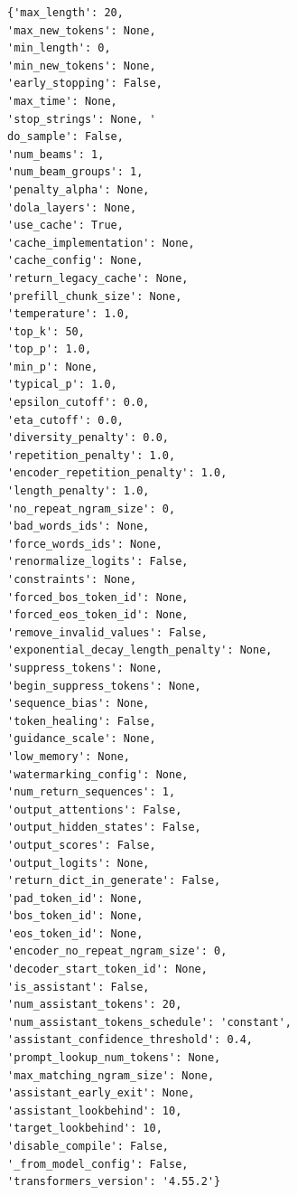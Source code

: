 \begin{verbatim}
{'max_length': 20, 
'max_new_tokens': None, 
'min_length': 0, 
'min_new_tokens': None, 
'early_stopping': False, 
'max_time': None, 
'stop_strings': None, '
do_sample': False, 
'num_beams': 1, 
'num_beam_groups': 1, 
'penalty_alpha': None, 
'dola_layers': None, 
'use_cache': True, 
'cache_implementation': None, 
'cache_config': None, 
'return_legacy_cache': None, 
'prefill_chunk_size': None, 
'temperature': 1.0, 
'top_k': 50, 
'top_p': 1.0, 
'min_p': None, 
'typical_p': 1.0, 
'epsilon_cutoff': 0.0, 
'eta_cutoff': 0.0, 
'diversity_penalty': 0.0, 
'repetition_penalty': 1.0, 
'encoder_repetition_penalty': 1.0, 
'length_penalty': 1.0, 
'no_repeat_ngram_size': 0, 
'bad_words_ids': None, 
'force_words_ids': None, 
'renormalize_logits': False, 
'constraints': None, 
'forced_bos_token_id': None, 
'forced_eos_token_id': None, 
'remove_invalid_values': False, 
'exponential_decay_length_penalty': None, 
'suppress_tokens': None, 
'begin_suppress_tokens': None, 
'sequence_bias': None, 
'token_healing': False, 
'guidance_scale': None, 
'low_memory': None, 
'watermarking_config': None, 
'num_return_sequences': 1, 
'output_attentions': False, 
'output_hidden_states': False, 
'output_scores': False, 
'output_logits': None, 
'return_dict_in_generate': False, 
'pad_token_id': None, 
'bos_token_id': None, 
'eos_token_id': None, 
'encoder_no_repeat_ngram_size': 0, 
'decoder_start_token_id': None, 
'is_assistant': False, 
'num_assistant_tokens': 20, 
'num_assistant_tokens_schedule': 'constant', 
'assistant_confidence_threshold': 0.4, 
'prompt_lookup_num_tokens': None, 
'max_matching_ngram_size': None, 
'assistant_early_exit': None, 
'assistant_lookbehind': 10, 
'target_lookbehind': 10, 
'disable_compile': False, 
'_from_model_config': False, 
'transformers_version': '4.55.2'}
\end{verbatim}